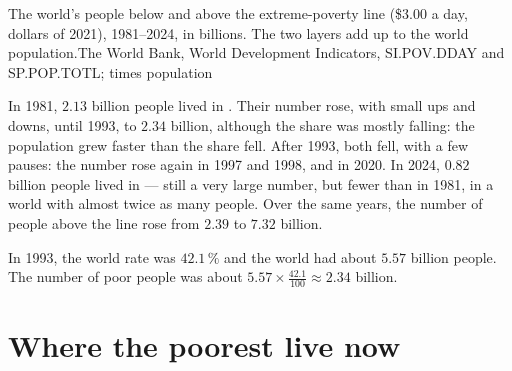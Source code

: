 \begin{omchart}{The world's people below and above the extreme-poverty line
(\$3.00 a day, dollars of 2021), 1981--2024, in billions. The two layers add
up to the world population.}{The World Bank, World Development Indicators,
SI.POV.DDAY and SP.POP.TOTL;  times population}
\end{omchart}

In 1981, $2.13$ billion people lived in . Their number rose,
with small ups and downs, until 1993, to $2.34$ billion, although the share was
mostly falling: the population grew faster than the share fell. After 1993, both
fell, with a few pauses: the number rose again in 1997 and 1998, and in 2020. In 2024,
$0.82$ billion people lived in  --- still a very large number,
but fewer than in 1981, in a world with almost twice as many people. Over the
same years, the number of people above the line rose from $2.39$ to $7.32$
billion.

\begin{example}\label{ex:g6:poverty:share-times-pop}
In 1993, the world rate was $42.1\,\%$ and the world had about $5.57$ billion
people. The number of poor people was about
$5.57 \times \frac{42.1}{100} \approx 2.34$ billion.
\end{example}

\section{Where the poorest live now}

